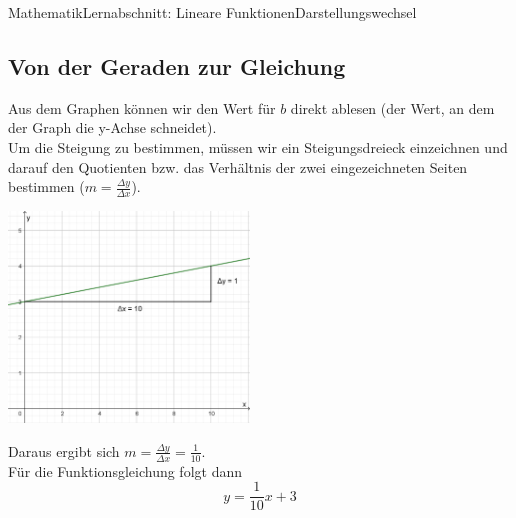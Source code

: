 \documentclass[11pt,twocolumn,oneside,openany,headings=optiontotoc,11pt,numbers=noenddot]{article}
\begin{document}
\begin{worksheet}{Mathematik}{Lernabschnitt: Lineare Funktionen}{Darstellungswechsel}
		\subsection{Von der Geraden zur Gleichung}
		Aus dem Graphen können wir den Wert für \(b\) direkt ablesen (der Wert, an dem der Graph die y-Achse schneidet).\\
		Um die Steigung zu bestimmen, müssen wir ein Steigungsdreieck einzeichnen und darauf den Quotienten bzw. das Verhältnis der zwei eingezeichneten Seiten bestimmen (\(m = \frac{\Delta{}y}{\Delta{}x}\)).\\
		\par\noindent
		\includegraphics[width=0.48\textwidth]{../99_Bilder/GzF.png}\\
		\par\noindent
		Daraus ergibt sich \(m = \frac{\Delta{}y}{\Delta{}x} = \frac{1}{10}\).\\
		Für die Funktionsgleichung folgt dann
		\[y = \frac{1}{10}x + 3\]

\end{worksheet}
\end{document}

